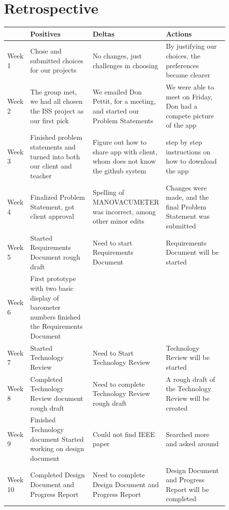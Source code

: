 \documentclass[onecolumn, draftclsnofoot,10pt, compsoc]{IEEEtran}
\begin{document}
\section{Retrospective}
\begin{center}
	\begin{tabular}{| l | p{0.3\linewidth} | p{0.3\linewidth} | p{0.3\linewidth} |}
		\hline
		& Positives & Deltas & Actions \\ \hline
    Week 1 & Chose and submitted choices for our projects
      & No changes, just challenges in choosing
      & By justifying our choices, the preferences became clearer \\ \hline
		Week 2 & The group met, we had all chosen the ISS project as our first pick
      & We emailed Don Pettit, for a meeting, and started our Problem Statements
      & We were able to meet on Friday, Don had a compete picture of the app\\ \hline			%
		Week 3 & Finished problem statements and turned into both our client and teacher
 & Figure out how to share app with client, whom does not know the github system
 & step by step instructions on how to download the app \\ \hline
		Week 4 & Finalized Problem Statement, got client approval
      & Spelling of MANOVACUMETER was incorrect, among other minor edits
      & Changes were made, and the final Problem Statement was submitted \\ \hline
    Week 5 & Started Requirements Document rough draft & Need to start Requirements Document & Requirements Document will be started \\ \hline
		Week 6 & First prototype with two basic display of barometer numbers
  finished the Requirements Document & & \\ \hline
		Week 7 & Started Technology Review & Need to Start Technology Review & Technology Review will be started \\ \hline
		Week 8 & Completed Technology Review document rough draft & Need to complete Technology Review rough draft & A rough draft of the Technology Review will be created \\ \hline
		Week 9 &Finished Technology document
Started working on design document
 & Could not find IEEE paper & Searched more and asked around\\ \hline
		Week 10 & Completed Design Document and Progress Report & Need to complete Design Document and Progress Report & Design Document and Progress Report will be completed \\ \hline

	\end{tabular}
\end{center}

\newpage


\end{document}
